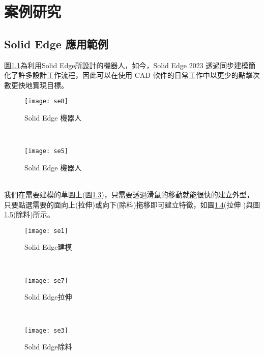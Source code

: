 \chapter{案例研究}
\section{Solid Edge 應用範例}
圖\ref{3.20}為利用Solid Edge所設計的機器人，如今，Solid Edge 2023 透過同步建模簡化了許多設計工作流程，因此可以在使用 CAD 軟件的日常工作中以更少的點擊次數更快地實現目標。\\
\begin{figure}[hbt!]
\begin{center}
\texttt{[image: se8]}
\caption{\Large Solid Edge 機器人}\label{3.20}
\end{center}
\end{figure}
\\
\begin{figure}[hbt!]
\begin{center}
\texttt{[image: se5]}
\caption{\Large Solid Edge 機器人}\label{3.27}
\end{center}
\end{figure}
\\

我們在需要建模的草圖上(圖\ref{3.21})，只需要透過滑鼠的移動就能很快的建立外型，只要點選需要的面向上(拉伸)或向下(除料)拖移即可建立特徵，如圖\ref{3.22}(拉伸 )與圖\ref{3.23}(除料)所示。\\
\begin{figure}[hbt!]
\begin{center}
\texttt{[image: se1]}
\caption{\Large Solid Edge建模}\label{3.21}
\end{center}
\end{figure}
\\
\begin{figure}[hbt!]
\begin{center}
\texttt{[image: se7]}
\caption{\Large Solid Edge拉伸}\label{3.22}
\end{center}
\end{figure}
\\
\begin{figure}[hbt!]
\begin{center}
\texttt{[image: se3]}
\caption{\Large Solid Edge除料}\label{3.23}
\end{center}
\end{figure}
\\



